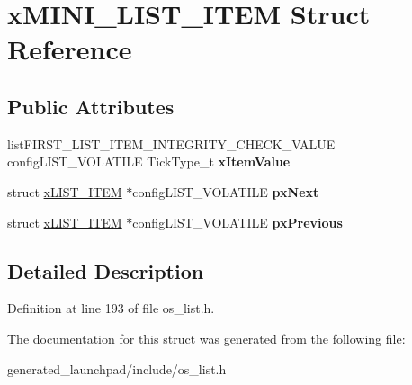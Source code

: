 \hypertarget{structxMINI__LIST__ITEM}{}\section{x\+M\+I\+N\+I\+\_\+\+L\+I\+S\+T\+\_\+\+I\+T\+EM Struct Reference}
\label{structxMINI__LIST__ITEM}
\subsection*{Public Attributes}
\begin{DoxyCompactItemize}
\item 
\mbox{\label{structxMINI__LIST__ITEM_aae79c54ac1efa30959e68604cc23b29e}} 
list\+F\+I\+R\+S\+T\+\_\+\+L\+I\+S\+T\+\_\+\+I\+T\+E\+M\+\_\+\+I\+N\+T\+E\+G\+R\+I\+T\+Y\+\_\+\+C\+H\+E\+C\+K\+\_\+\+V\+A\+L\+UE config\+L\+I\+S\+T\+\_\+\+V\+O\+L\+A\+T\+I\+LE Tick\+Type\+\_\+t {\bfseries x\+Item\+Value}
\item 
\mbox{\label{structxMINI__LIST__ITEM_aa7ae770b0f10daeb9ac76c6f7dd5608e}} 
struct \mbox{\hyperlink{structxLIST__ITEM}{x\+L\+I\+S\+T\+\_\+\+I\+T\+EM}} $\ast$config\+L\+I\+S\+T\+\_\+\+V\+O\+L\+A\+T\+I\+LE {\bfseries px\+Next}
\item 
\mbox{\label{structxMINI__LIST__ITEM_a732c666bb97560eb1b094a2c411269ab}} 
struct \mbox{\hyperlink{structxLIST__ITEM}{x\+L\+I\+S\+T\+\_\+\+I\+T\+EM}} $\ast$config\+L\+I\+S\+T\+\_\+\+V\+O\+L\+A\+T\+I\+LE {\bfseries px\+Previous}
\end{DoxyCompactItemize}


\subsection{Detailed Description}


Definition at line 193 of file os\+\_\+list.\+h.



The documentation for this struct was generated from the following file\+:\begin{DoxyCompactItemize}
\item 
generated\+\_\+launchpad/include/os\+\_\+list.\+h\end{DoxyCompactItemize}
